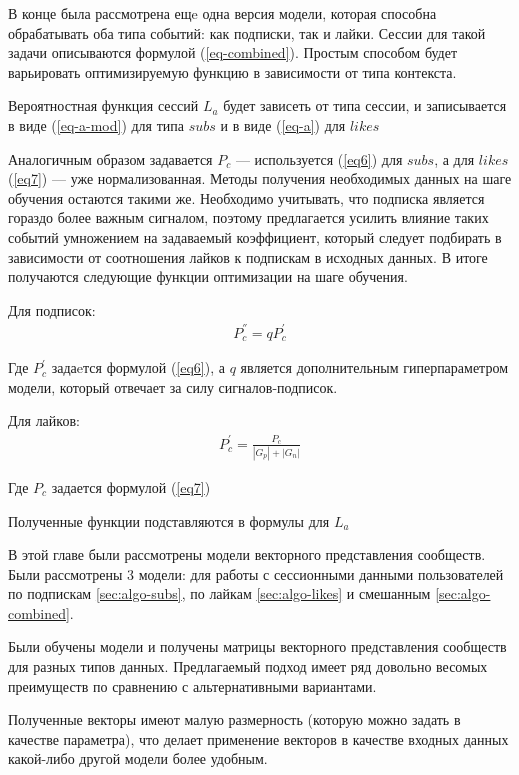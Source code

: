 \documentclass[times,specification,annotation]{itmo-student-thesis}
\begin{document}
В конце была рассмотрена ещe одна версия модели, которая способна обрабатывать оба типа событий: как подписки, так и лайки. Сессии для такой задачи описываются формулой (\ref{eq-combined}). Простым способом будет варьировать оптимизируемую функцию в зависимости от типа контекста. 

Вероятностная функция сессий $L_a$ будет зависеть от типа сессии, и записывается в виде (\ref{eq-a-mod}) для типа $subs$ и в виде (\ref{eq-a}) для $likes$

Аналогичным образом задавается $P_c$ --- используется (\ref{eq6}) для $subs$, а для $likes$ (\ref{eq7}) --- уже нормализованная. Методы получения необходимых данных на шаге обучения остаются такими же. Необходимо учитывать, что подписка является гораздо более важным сигналом, поэтому предлагается усилить влияние таких событий умножением на задаваемый коэффициент, который следует подбирать в зависимости от соотношения лайков к подпискам в исходных данных. В итоге получаются следующие функции оптимизации на шаге обучения.

Для подписок:
\begin{align*}
P^{''}_c = qP^{'}_c
\end{align*}

Где $P^{'}_c$ задаeтся формулой  (\ref{eq6}), а $q$ является дополнительным гиперпараметром модели, который отвечает за силу сигналов-подписок. 

Для лайков:
\begin{align*}
P^{'}_c = \frac{P_c}{|G_p| +|G_n|} 
\end{align*}

Где $P_c$ задается формулой  (\ref{eq7})

Полученные функции подставляются в формулы для $L_a$

\chapterconclusion

В этой главе были рассмотрены модели векторного представления сообществ. Были рассмотрены 3 модели: для работы с сессионными данными пользователей по подпискам \ref{sec:algo-subs}, по лайкам \ref{sec:algo-likes} и смешанным \ref{sec:algo-combined}.

Были обучены модели и получены матрицы векторного представления сообществ для разных типов данных. Предлагаемый подход имеет ряд довольно весомых преимуществ по сравнению с альтернативными вариантами. 

Полученные векторы имеют малую размерность (которую можно задать в качестве параметра), что
делает применение векторов в качестве входных данных какой-либо другой
модели более удобным. 
\end{document}
